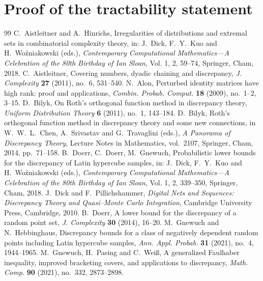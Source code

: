 \documentclass[10pt,a4paper]{amsart}
\newcommand{\1}{\mathbf{1}}
\begin{document}
\section{Proof of the tractability statement}\label{sec:proof-tractability}


\begin{thebibliography}{99}
 C.~Aistleitner and A.~Hinrichs, \newblock Irregularities of distributions and extremal sets in combinatorial complexity theory, \newblock in: J.~Dick, F.~Y.~Kuo and H.~Wo\'{z}niakowski (eds.), \emph{Contemporary Computational Mathematics---A Celebration of the 80th Birthday of Ian Sloan}, Vol. 1, 2, 59--74, Springer, Cham, 2018.
 C.~Aistleitner, \newblock Covering numbers, dyadic chaining and discrepancy, \newblock \emph{J. Complexity} \textbf{27} (2011), no.~6, 531--540.
 N.~Alon, \newblock Perturbed identity matrices have high rank: proof and applications, \newblock \emph{Combin. Probab. Comput.} \textbf{18} (2009), no.~1--2, 3--15.
 D.~Bilyk, \newblock On Roth's orthogonal function method in discrepancy theory, \newblock \emph{Uniform Distribution Theory} \textbf{6} (2011), no.~1, 143--184.
 D.~Bilyk, \newblock Roth's orthogonal function method in discrepancy theory and some new connections, \newblock in W.~W.~L.~Chen, A.~Srivastav and G.~Travaglini (eds.), \emph{A Panorama of Discrepancy Theory}, Lecture Notes in Mathematics, vol.~2107, Springer, Cham, 2014, pp.~71--158.
 B.~Doerr, C.~Doerr, M.~Gnewuch, \newblock Probabilistic lower bounds for the discrepancy of Latin hypercube samples, \newblock in: J.~Dick, F.~Y.~Kuo and H.~Wo\'{z}niakowski (eds.), \emph{Contemporary Computational Mathematics---A Celebration of the 80th Birthday of Ian Sloan}, Vol. 1, 2, 339--350, Springer, Cham, 2018.
 J.~Dick and F.~Pillichshammer, \newblock \emph{Digital Nets and Sequences: Discrepancy Theory and Quasi--Monte Carlo Integration}, \newblock Cambridge University Press, Cambridge, 2010.
 B.~Doerr, \newblock A lower bound for the discrepancy of a random point set, \newblock \emph{J. Complexity} \textbf{30} (2014), 16--20.
 M.~Gnewuch and N.~Hebbinghaus, \newblock Discrepancy bounds for a class of negatively dependent random points including Latin hypercube samples, \newblock \emph{Ann. Appl. Probab.} \textbf{31} (2021), no.~4, 1944--1965.
 M.~Gnewuch, H.~Pasing and C.~Wei\ss, \newblock A generalized Faulhaber inequality, improved bracketing covers, and applications to discrepancy, \newblock \emph{Math. Comp.} \textbf{90} (2021), no.~332, 2873--2898.

\end{thebibliography}
\end{document}
